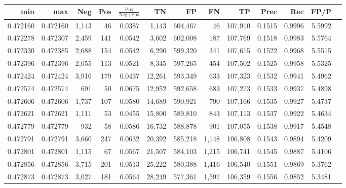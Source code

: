 \begin{tabular}{rrrrrrrrrrrrr}
\toprule
     min &      max &   Neg &   Pos & $\frac{\text{Pos}}{\text{Neg}+\text{Pos}}$ &      TN &      FP &      FN &      TP &   Prec &    Rec &   FP/P \\
\midrule
0.472160 & 0.472160 & 1,143 &    46 &                                     0.0387 &   1,143 & 604,467 &      46 & 107,910 & 0.1515 & 0.9996 & 5.5992 \\
0.472278 & 0.472307 & 2,459 &   141 &                                     0.0542 &   3,602 & 602,008 &     187 & 107,769 & 0.1518 & 0.9983 & 5.5764 \\
0.472330 & 0.472385 & 2,688 &   154 &                                     0.0542 &   6,290 & 599,320 &     341 & 107,615 & 0.1522 & 0.9968 & 5.5515 \\
0.472396 & 0.472396 & 2,055 &   113 &                                     0.0521 &   8,345 & 597,265 &     454 & 107,502 & 0.1525 & 0.9958 & 5.5325 \\
0.472424 & 0.472424 & 3,916 &   179 &                                     0.0437 &  12,261 & 593,349 &     633 & 107,323 & 0.1532 & 0.9941 & 5.4962 \\
0.472574 & 0.472574 &   691 &    50 &                                     0.0675 &  12,952 & 592,658 &     683 & 107,273 & 0.1533 & 0.9937 & 5.4898 \\
0.472606 & 0.472606 & 1,737 &   107 &                                     0.0580 &  14,689 & 590,921 &     790 & 107,166 & 0.1535 & 0.9927 & 5.4737 \\
0.472621 & 0.472621 & 1,111 &    53 &                                     0.0455 &  15,800 & 589,810 &     843 & 107,113 & 0.1537 & 0.9922 & 5.4634 \\
0.472779 & 0.472779 &   932 &    58 &                                     0.0586 &  16,732 & 588,878 &     901 & 107,055 & 0.1538 & 0.9917 & 5.4548 \\
0.472791 & 0.472791 & 3,660 &   247 &                                     0.0632 &  20,392 & 585,218 &   1,148 & 106,808 & 0.1543 & 0.9894 & 5.4209 \\
0.472801 & 0.472801 & 1,115 &    67 &                                     0.0567 &  21,507 & 584,103 &   1,215 & 106,741 & 0.1545 & 0.9887 & 5.4106 \\
0.472856 & 0.472856 & 3,715 &   201 &                                     0.0513 &  25,222 & 580,388 &   1,416 & 106,540 & 0.1551 & 0.9869 & 5.3762 \\
0.472873 & 0.472873 & 3,027 &   181 &                                     0.0564 &  28,249 & 577,361 &   1,597 & 106,359 & 0.1556 & 0.9852 & 5.3481 \\

\end{tabular}
